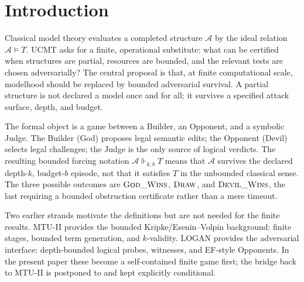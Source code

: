 \documentclass[11pt]{article}
\theoremstyle{definition}
\theoremstyle{plain}
\newcommand{\Thy}{T}
\newcommand{\Struct}{\mathcal{A}}
\newcommand{\kbforces}{\Vdash_{k,b}}      %
\begin{document}
\tableofcontents

\section{Introduction}

Classical model theory evaluates a completed structure $\Struct$ by the ideal relation
$\Struct\models\Thy$.  UCMT asks for a finite, operational substitute: what can be certified when
structures are partial, resources are bounded, and the relevant tests are chosen adversarially?  The
central proposal is that, at finite computational scale, modelhood should be replaced by bounded
adversarial survival.  A partial structure is not declared a model once and for all; it survives a
specified attack surface, depth, and budget.

The formal object is a game between a Builder, an Opponent, and a symbolic Judge.  The Builder (God)
proposes legal semantic edits; the Opponent (Devil) selects legal challenges; the Judge is the only
source of logical verdicts.  The resulting bounded forcing notation $\Struct\kbforces\Thy$ means that
$\Struct$ survives the declared depth-$k$, budget-$b$ episode, not that it satisfies $\Thy$ in the
unbounded classical sense.  The three possible outcomes are $\textsc{God\_Wins}$, $\textsc{Draw}$, and
$\textsc{Devil\_Wins}$, the last requiring a bounded obstruction certificate rather than a mere timeout.

Two earlier strands motivate the definitions but are not needed for the finite results.  MTU-II
\cite{Mannucci2023MTU2} provides the bounded Kripke/Esenin--Volpin background: finite stages, bounded
term generation, and $k$-validity.  LOGAN \cite{Mannucci2025LOGAN} provides the adversarial interface:
depth-bounded logical probes, witnesses, and EF-style Opponents.  In the present paper these become a
self-contained finite game first; the bridge back to MTU-II is postponed to  and
kept explicitly conditional.
\end{document}
